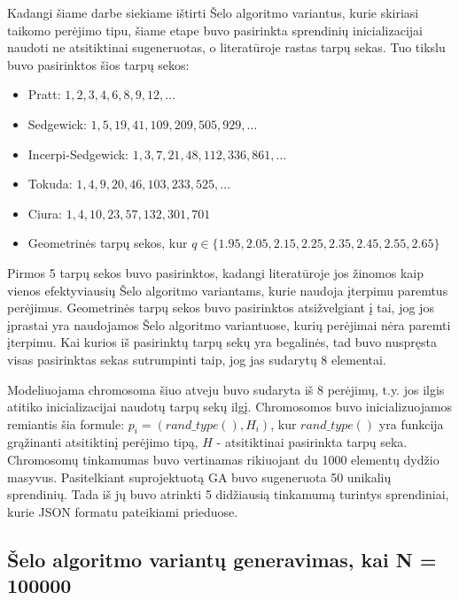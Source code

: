 \documentclass{VUMIFInfKursinis}
\begin{document}
Kadangi šiame darbe siekiame ištirti Šelo algoritmo variantus, kurie skiriasi taikomo perėjimo tipu,
šiame etape buvo pasirinkta sprendinių inicializacijai naudoti ne atsitiktinai sugeneruotas, o literatūroje rastas tarpų sekas.
Tuo tikslu buvo pasirinktos šios tarpų sekos:
\begin{itemize}
  \item Pratt: $1, 2, 3, 4, 6, 8, 9, 12, \ldots$ \cite{pratt1972shellsort}
  \item Sedgewick: $1, 5, 19, 41, 109, 209, 505, 929, \ldots$ \cite{SEDGEWICK1986159}
  \item Incerpi-Sedgewick: $1, 3, 7, 21, 48, 112, 336, 861, \ldots$ \cite{incerpi1985improved}
  \item Tokuda: $1, 4, 9, 20, 46, 103, 233, 525, \ldots $ \cite{10.5555/645569.659879}
  \item Ciura: $1, 4, 10, 23, 57, 132, 301, 701$ \cite{ciura2001best}
  \item Geometrinės tarpų sekos, kur $ q \in \{1.95, 2.05, 2.15, 2.25, 2.35, 2.45, 2.55, 2.65 \}$ \cite{Radavičius_Baranauskas_2013}
\end{itemize}
Pirmos 5 tarpų sekos buvo pasirinktos, kadangi literatūroje jos žinomos kaip vienos efektyviausių
Šelo algoritmo variantams, kurie naudoja įterpimu paremtus perėjimus.
Geometrinės tarpų sekos buvo pasirinktos atsižvelgiant į tai, jog jos įprastai yra naudojamos
Šelo algoritmo variantuose, kurių perėjimai nėra paremti įterpimu.
Kai kurios iš pasirinktų tarpų sekų yra begalinės, tad buvo nuspręsta visas pasirinktas sekas sutrumpinti taip, jog jas sudarytų 8 elementai.

Modeliuojama chromosoma šiuo atveju buvo sudaryta iš 8 perėjimų, t.y. jos ilgis atitiko
inicializacijai naudotų tarpų sekų ilgį.
Chromosomos buvo inicializuojamos remiantis šia formule:
$p_i = (rand\_type(), H_i)$, kur $rand\_type()$ yra funkcija grąžinanti atsitiktinį perėjimo tipą, $H$ - atsitiktinai pasirinkta tarpų seka.
Chromosomų tinkamumas buvo vertinamas rikiuojant du 1000 elementų dydžio masyvus.
Pasitelkiant suprojektuotą GA buvo sugeneruota 50 unikalių sprendinių.
Tada iš jų buvo atrinkti 5 didžiausią tinkamumą turintys sprendiniai, kurie JSON formatu pateikiami prieduose. %

\subsection{Šelo algoritmo variantų generavimas, kai N = 100000}
\end{document}
